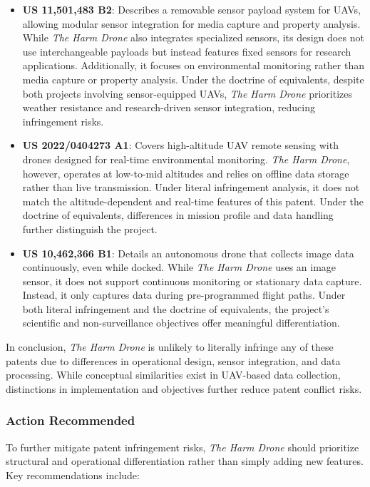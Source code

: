 \documentclass[12pt]{article}
\begin{document}
\begin{itemize}
    \item \textbf{US 11,501,483 B2}: Describes a removable sensor payload system for UAVs, allowing modular sensor integration for media capture and property analysis. While \textit{The Harm Drone} also integrates specialized sensors, its design does not use interchangeable payloads but instead features fixed sensors for research applications. Additionally, it focuses on environmental monitoring rather than media capture or property analysis. Under the doctrine of equivalents, despite both projects involving sensor-equipped UAVs, \textit{The Harm Drone} prioritizes weather resistance and research-driven sensor integration, reducing infringement risks.

    \item \textbf{US 2022/0404273 A1}: Covers high-altitude UAV remote sensing with drones designed for real-time environmental monitoring. \textit{The Harm Drone}, however, operates at low-to-mid altitudes and relies on offline data storage rather than live transmission. Under literal infringement analysis, it does not match the altitude-dependent and real-time features of this patent. Under the doctrine of equivalents, differences in mission profile and data handling further distinguish the project.

    \item \textbf{US 10,462,366 B1}: Details an autonomous drone that collects image data continuously, even while docked. While \textit{The Harm Drone} uses an image sensor, it does not support continuous monitoring or stationary data capture. Instead, it only captures data during pre-programmed flight paths. Under both literal infringement and the doctrine of equivalents, the project's scientific and non-surveillance objectives offer meaningful differentiation.
\end{itemize}

In conclusion, \textit{The Harm Drone} is unlikely to literally infringe any of these patents due to differences in operational design, sensor integration, and data processing. While conceptual similarities exist in UAV-based data collection, distinctions in implementation and objectives further reduce patent conflict risks.

\subsubsection{Action Recommended}

To further mitigate patent infringement risks, \textit{The Harm Drone} should prioritize structural and operational differentiation rather than simply adding new features. Key recommendations include:
\end{document}
